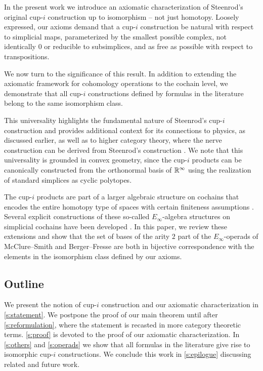 In the present work we introduce an axiomatic characterization of Steenrod's original cup-$i$ construction up to isomorphism -- not just homotopy.
Loosely expressed, our axioms demand that a cup-$i$ construction be natural with respect to simplicial maps, parameterized by the smallest possible complex, not identically $0$ or reducible to subsimplices, and as free as possible with respect to transpositions.

We now turn to the significance of this result.
In addition to extending the axiomatic framework for cohomology operations \cite{serre1053eilenberg_maclane, cartan1955iteration, steenrod1962cohomology} to the cochain level, we demonstrate that all cup-$i$ constructions defined by formulas in the literature \cite{steenrod1947products, real1996computability, mcclure2003multivariable, berger2004combinatorial, medina2020prop1, medina2023fast_sq} belong to the same isomorphism class.

This universality highlights the fundamental nature of Steenrod's cup-$i$ construction and provides additional context for its connections to physics, as discussed earlier, as well as to higher category theory, where the nerve construction can be derived from Steenrod's construction \cite{street1987orientals, medina2020globular}.
We note that this universality is grounded in convex geometry, since the cup-$i$ products can be canonically constructed from the orthonormal basis of $\mathbb{R}^\infty$ using the realization of standard simplices as cyclic polytopes.

The cup-$i$ products are part of a larger algebraic structure on cochains that encodes the entire homotopy type of spaces with certain finiteness assumptions \cite{mandell2006homotopy_type}.
Several explicit constructions of these so-called $E_\infty$-algebra structures on simplicial cochains have been developed \cite{mcclure2003multivariable, berger2004combinatorial, medina2020prop1}.
In this paper, we review these extensions and show that the set of bases of the arity $2$ part of the $E_\infty$-operads of McClure--Smith and Berger--Fresse are both in bijective correspondence with the elements in the isomorphism class defined by our axioms.

\subsection*{Outline}

We present the notion of cup-$i$ construction and our axiomatic characterization in \cref{s:statement}.
We postpone the proof of our main theorem until after \cref{s:reformulation}, where the statement is recasted in more category theoretic terms.
\cref{s:proof} is devoted to the proof of our axiomatic characterization.
In \cref{s:others} and \cref{s:operads} we show that all formulas in the literature give rise to isomorphic \mbox{cup-$i$} constructions.
We conclude this work in \cref{s:epilogue} discussing related and future work.